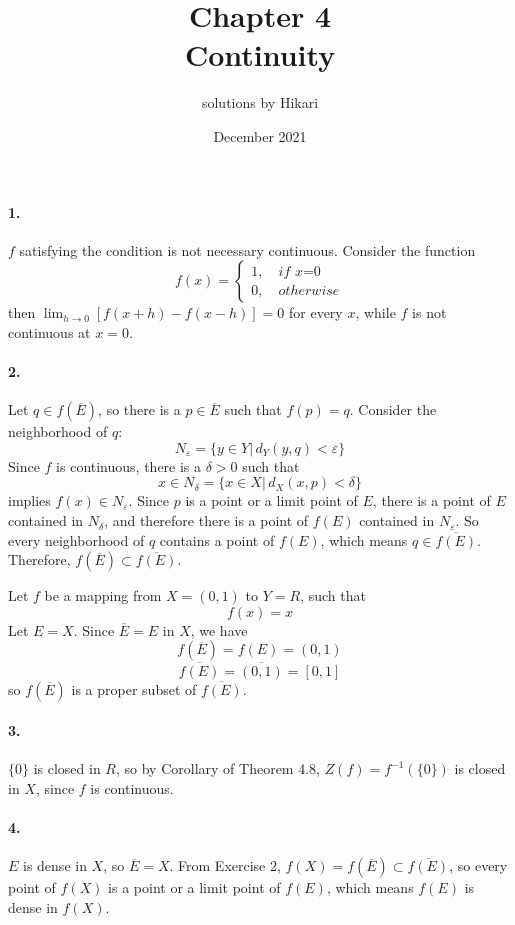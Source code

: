 \documentclass[a4paper]{article}
\title{Chapter 4\\Continuity}
\author{solutions by Hikari}
\date{December 2021}
\begin{document}
\newcommand{\V}{\mathbf}
\newcommand{\diam}[1]{\mathrm{diam}\,#1}

\maketitle

\paragraph{1.}
$f$ satisfying the condition is not necessary continuous. Consider the function
\[
f(x)=
\begin{cases}
1,\quad \textit{if x=0}\\
0,\quad otherwise
\end{cases}
\]
then $\lim_{h\to 0}[f(x+h)-f(x-h)]=0$ for every $x$, while $f$ is not continuous at $x=0$.

\paragraph{2.}
Let $q\in f(\overline{E})$, so there is a $p\in\overline{E}$ such that $f(p)=q$. Consider the neighborhood of $q$: \[N_\varepsilon=\{y\in Y|\,d_Y(y,q)<\varepsilon \}\]
Since $f$ is continuous, there is a $\delta>0$ such that 
\[x\in N_{\delta}=\{x\in X|\,d_X(x,p)<\delta\}\] implies $f(x)\in N_\varepsilon$. Since $p$ is a point or a limit point of $E$, there is a point of $E$ contained in $N_\delta$, and therefore there is a point of $f(E)$ contained in $N_\varepsilon$. So every neighborhood of $q$ contains a point of $f(E)$, which means $q\in\overline{f(E)}$. Therefore, $f(\overline{E})\subset\overline{f(E)}$.
\medskip

Let $f$ be a mapping from $X=(0,1)$ to $Y=R$, such that 
\[
f(x)=x
\]
Let $E=X$. Since $\overline{E}=E$ in $X$, we have
\[
f(\overline{E})=f(E)=(0,1)
\]
\[
\overline{f(E)}=\overline{(0,1)}=[0,1]
\]
so $f(\overline{E})$ is a proper subset of $\overline{f(E)}$.

\paragraph{3.}
$\{0\}$ is closed in $R$, so by Corollary of Theorem 4.8, $Z(f)=f^{-1}(\{0\})$ is closed in $X$, since $f$ is continuous.

\paragraph{4.}
$E$ is dense in $X$, so $\overline{E}=X$. From Exercise 2, $f(X)=f(\overline{E})\subset\overline{f(E)}$, so every point of $f(X)$ is a point or a limit point of $f(E)$, which means $f(E)$ is dense in $f(X)$.
\end{document}
